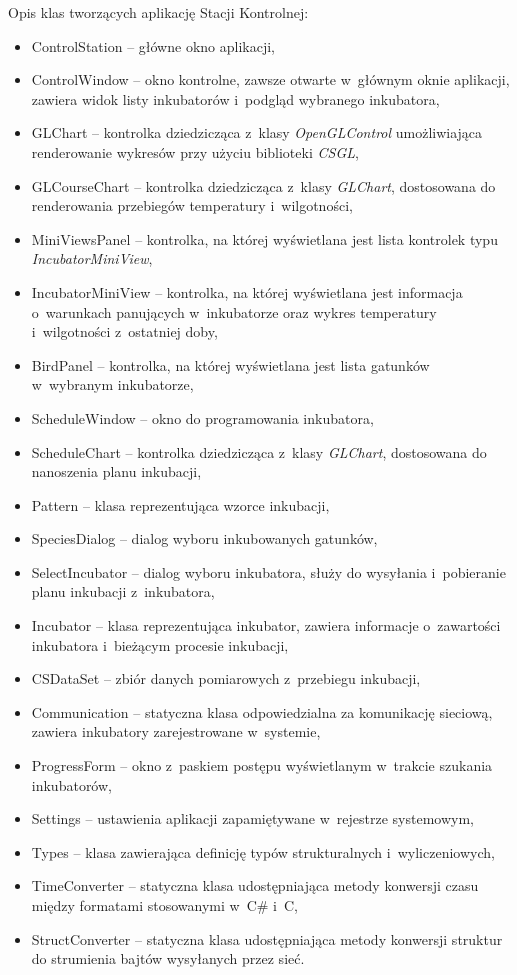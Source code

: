 \noindent Opis klas tworzących aplikację Stacji Kontrolnej:
\begin{itemize}
	\item ControlStation -- główne okno aplikacji,
	\item ControlWindow -- okno kontrolne, zawsze otwarte w~głównym oknie aplikacji, zawiera widok listy inkubatorów i~podgląd wybranego inkubatora,
	\item GLChart -- kontrolka dziedzicząca z~klasy \emph{OpenGLControl} umożliwiająca renderowanie wykresów przy użyciu biblioteki \emph{CSGL},
	\item GLCourseChart -- kontrolka dziedzicząca z~klasy \emph{GLChart}, dostosowana do renderowania przebiegów temperatury i~wilgotności,
	\item MiniViewsPanel -- kontrolka, na której wyświetlana jest lista kontrolek typu \emph{IncubatorMiniView},
	\item IncubatorMiniView -- kontrolka, na której wyświetlana jest informacja o~warunkach panujących w~inkubatorze oraz wykres temperatury i~wilgotności z~ostatniej doby,
	\item BirdPanel -- kontrolka, na której wyświetlana jest lista gatunków w~wybranym inkubatorze,
	\item ScheduleWindow -- okno do programowania inkubatora,
	\item ScheduleChart -- kontrolka dziedzicząca z~klasy \emph{GLChart}, dostosowana do nanoszenia planu inkubacji,
	\item Pattern -- klasa reprezentująca wzorce inkubacji,
	\item SpeciesDialog -- dialog wyboru inkubowanych gatunków,
	\item SelectIncubator -- dialog wyboru inkubatora, służy do wysyłania i~pobieranie planu inkubacji z~inkubatora,
	\item Incubator -- klasa reprezentująca inkubator, zawiera informacje o~zawartości inkubatora i~bieżącym procesie inkubacji,
	\item CSDataSet -- zbiór danych pomiarowych z~przebiegu inkubacji,
	\item Communication -- statyczna klasa odpowiedzialna za komunikację sieciową, zawiera inkubatory zarejestrowane w~systemie,
	\item ProgressForm -- okno z~paskiem postępu wyświetlanym w~trakcie szukania inkubatorów,
	\item Settings -- ustawienia aplikacji zapamiętywane w~rejestrze systemowym,
	\item Types -- klasa zawierająca definicję typów strukturalnych i~wyliczeniowych,
	\item TimeConverter -- statyczna klasa udostępniająca metody konwersji czasu między
		formatami stosowanymi w~C\# i~C,
	\item StructConverter -- statyczna klasa udostępniająca metody konwersji struktur do strumienia bajtów wysyłanych przez sieć.
\end{itemize}

